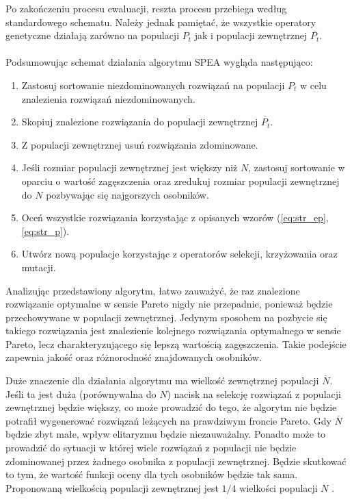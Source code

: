 \documentclass[twoside]{iisthesis}
\begin{document}
Po zakończeniu procesu ewaluacji, reszta procesu przebiega według standardowego schematu. Należy jednak pamiętać, że wszystkie operatory genetyczne działają zarówno na populacji $P_{t}$ jak i populacji zewnętrznej $\overline{P_{t}}$.\\\\
Podsumowując schemat działania algorytmu SPEA wygląda następująco:\\
\begin{enumerate}
	\item Zastosuj sortowanie niezdominowanych rozwiązań na populacji $P_{t}$ w celu znalezienia rozwiązań niezdominowanych.
	\item Skopiuj znalezione rozwiązania do populacji zewnętrznej $\overline{P_{t}}$.
	\item Z populacji zewnętrznej usuń rozwiązania zdominowane.
	\item Jeśli rozmiar populacji zewnętrznej jest większy niż $N$, zastosuj sortowanie w oparciu o wartość zagęszczenia oraz zredukuj rozmiar populacji zewnętrznej do $N$ pozbywając się najgorszych osobników.
	\item Oceń wszystkie rozwiązania korzystając z opisanych wzorów (\ref{eq:str_ep}, \ref{eq:str_p}).
	\item Utwórz nową populacje korzystając z operatorów selekcji, krzyżowania oraz mutacji.\\
\end{enumerate}

Analizując przedstawiony algorytm, łatwo zauważyć, że raz znalezione rozwiązanie optymalne w sensie Pareto nigdy nie przepadnie, ponieważ będzie przechowywane w populacji zewnętrznej. Jedynym sposobem na pozbycie się takiego rozwiązania jest znalezienie kolejnego rozwiązania optymalnego w sensie Pareto, lecz charakteryzującego się lepszą wartością zagęszczenia. Takie podejście zapewnia jakość oraz różnorodność znajdowanych osobników.

Duże znaczenie dla działania algorytmu ma wielkość zewnętrznej populacji $\overline{N}$. Jeśli ta jest duża (porównywalna do $N$)  nacisk na selekcję rozwiązań z populacji zewnętrznej będzie większy, co może prowadzić do tego, że algorytm nie będzie potrafił wygenerować rozwiązań leżących na prawdziwym froncie Pareto. Gdy $\overline{N}$ będzie zbyt małe, wpływ elitaryzmu będzie niezauważalny. Ponadto może to prowadzić do sytuacji w której wiele rozwiązań z populacji nie będzie zdominowanej przez żadnego osobnika z populacji zewnętrznej. Będzie skutkować to tym, że wartość funkcji oceny dla tych osobników będzie tak sama. Proponowaną wielkością populacji zewnętrznej jest $1/4$ wielkości populacji $N$ \cite{book}.
\end{document}
